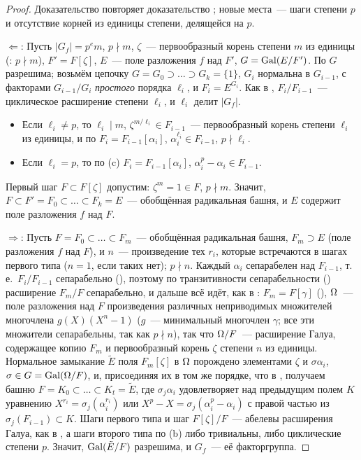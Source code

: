 \begin{proof}
Доказательство повторяет доказательство ; новые места~--- шаги степени $p$ и отсутствие корней из единицы степени,
делящейся на $p$.

$\Leftarrow$: Пусть $|G_f|=p^em$, $p\nmid m$, $\zeta$~--- первообразный корень степени $m$ из единицы (: $p\nmid m$),
$F'=F[\zeta]$, $E$~--- поле разложения $f$ над $F'$, $G=\operatorname{Gal}(E/F')$. По  $G$ разрешима; возьмём цепочку
$G=G_0\supset\dots\supset G_k=\{1\}$, $G_i$ нормальна в $G_{i-1}$, с факторами $G_{i-1}/G_i$ \emph{простого} порядка $\ell_i$, и
$F_i=E^{G_i}$. Как в , $F_i/F_{i-1}$~--- циклическое расширение степени $\ell_i$, и $\ell_i$ делит $|G_f|$.
\begin{itemize}
\item Если $\ell_i\ne p$, то $\ell_i\mid m$, $\zeta^{m/\ell_i}\in F_{i-1}$~--- первообразный корень степени $\ell_i$ из единицы, и
по  $F_i=F_{i-1}[\alpha_i]$, $\alpha_i^{\ell_i}\in F_{i-1}$, $p\nmid\ell_i$.
\item Если $\ell_i=p$, то по (c) $F_i=F_{i-1}[\alpha_i]$, $\alpha_i^p-\alpha_i\in F_{i-1}$.
\end{itemize}
Первый шаг $F\subset F[\zeta]$ допустим: $\zeta^m=1\in F$, $p\nmid m$. Значит, $F\subset F'=F_0\subset\dots\subset F_k=E$~---
обобщённая радикальная башня, и $E$ содержит поле разложения $f$ над $F$.

$\Rightarrow$: Пусть $F=F_0\subset\dots\subset F_m$~--- обобщённая радикальная башня, $F_m\supset E$ (поле разложения $f$
над $F$), и $n$~--- произведение тех $r_i$, которые встречаются в шагах первого типа ($n=1$, если таких нет); $p\nmid n$.
Каждый $\alpha_i$ сепарабелен над $F_{i-1}$, т.\,е.\ $F_i/F_{i-1}$ сепарабельно (), поэтому по транзитивности
сепарабельности () расширение $F_m/F$ сепарабельно, и дальше всё идёт, как в : $F_m=F[\gamma]$ (), $\Omega$~--- поле разложения над $F$ произведения различных
неприводимых множителей многочлена $g(X)(X^n-1)$ ($g$~--- минимальный многочлен $\gamma$; все эти множители
сепарабельны, так как $p\nmid n$), так что $\Omega/F$~--- расширение Галуа, содержащее копию $F_m$ и первообразный корень
$\zeta$ степени $n$ из единицы. Нормальное замыкание $\tilde E$ поля $F_m[\zeta]$ в $\Omega$ порождено элементами $\zeta$ и
$\sigma\alpha_i$, $\sigma\in G=\operatorname{Gal}(\Omega/F)$, и, присоединяя их в том же порядке, что в , получаем башню
$F=K_0\subset\dots\subset K_t=\tilde E$, где $\sigma_j\alpha_i$ удовлетворяет над предыдущим полем $K$ уравнению
$X^{r_i}=\sigma_j(\alpha_i^{r_i})$ или $X^p-X=\sigma_j(\alpha_i^p-\alpha_i)$ с правой частью из $\sigma_j(F_{i-1})\subset K$. Шаги
первого типа и шаг $F[\zeta]/F$~--- абелевы расширения Галуа, как в , а шаги второго типа по (b) либо
тривиальны, либо циклические степени $p$. Значит, $\operatorname{Gal}(\tilde E/F)$ разрешима, и $G_f$~--- её факторгруппа.
\end{proof}

